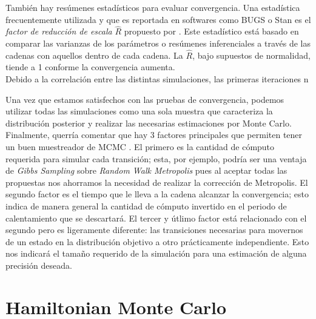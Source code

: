 También hay resúmenes estadísticos para evaluar convergencia. Una estadística frecuentemente utilizada y que es reportada en softwares como BUGS o Stan es el \textit{factor de reducción de escala} $\hat{R}$ propuesto por \textcite{GelmanRubin92}. Este estadístico está basado en comparar las varianzas de los parámetros o resúmenes inferenciales a través de las cadenas con aquellos dentro de cada cadena. La $\hat{R}$, bajo supuestos de normalidad, tiende a 1 conforme la convergencia aumenta.\\

Debido a la correlación entre las distintas simulaciones, las primeras iteraciones n


Una vez que estamos satisfechos con las pruebas de convergencia, podemos utilizar todas las simulaciones como una sola muestra que caracteriza la distribución posterior y realizar las necesarias estimaciones por Monte Carlo.\\ 

Finalmente, querría comentar que hay 3 factores principales que permiten tener un buen muestreador de MCMC \parencite{Neal93}. El primero es la cantidad de cómputo requerida para simular cada transición; esta, por ejemplo, podría ser una ventaja de \textit{Gibbs Sampling} sobre \textit{Random Walk Metropolis} pues al aceptar todas las propuestas nos ahorramos la necesidad de realizar la corrección de Metropolis. El segundo factor es el tiempo que le lleva a la cadena alcanzar la convergencia; esto indica de manera general la cantidad de cómputo invertido en el periodo de calentamiento que se descartará. El tercer y útlimo factor está relacionado con el segundo pero es ligeramente diferente: las transiciones necesarias para movernos de un estado en la distribución objetivo a otro prácticamente independiente. Esto nos indicará el tamaño requerido de la simulación para una estimación de alguna precisión deseada.  


\section{Hamiltonian Monte Carlo}
